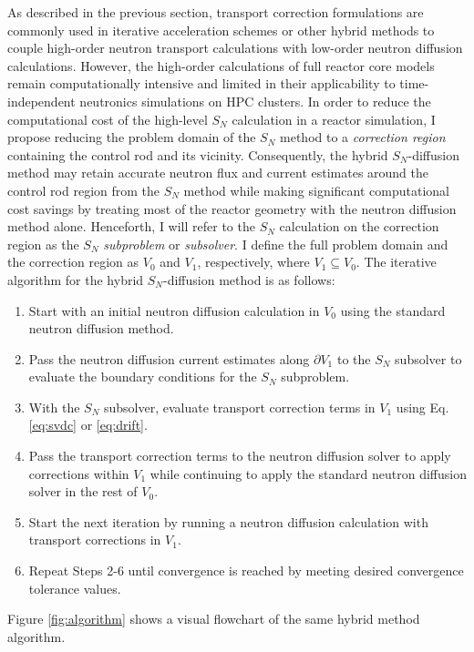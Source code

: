 As described in the previous section, transport correction formulations are commonly used in
iterative acceleration schemes or other hybrid methods to couple high-order neutron transport
calculations with low-order neutron diffusion calculations. However, the high-order calculations of
full reactor core models remain computationally intensive and limited in their applicability to
time-independent neutronics simulations on \gls{HPC} clusters.
In order to reduce the computational cost of the high-level $S_N$ calculation in a reactor
simulation, I propose reducing
the problem domain of the $S_N$ method to a \textit{correction region} containing the control rod
and its vicinity. Consequently, the hybrid $S_N$-diffusion method may retain accurate neutron flux
and current estimates around the control rod region from the $S_N$ method while making significant
computational cost savings by treating most of the reactor geometry with the neutron diffusion
method alone. Henceforth, I will refer to the $S_N$ calculation on the correction
region as the $S_N$ \textit{subproblem} or \textit{subsolver}. I define the full problem
domain and the correction region as $V_0$ and $V_1$, respectively, where
$V_1\subseteq V_0$. The iterative algorithm for the hybrid $S_N$-diffusion method is as follows:
%
\begin{enumerate}
  \item Start with an initial neutron diffusion calculation in $V_0$ using the standard neutron
    diffusion method.
  \item Pass the neutron diffusion current estimates along
    $\partial V_1$ to the $S_N$ subsolver to evaluate the boundary conditions for the $S_N$
    subproblem.
  \item With the $S_N$ subsolver, evaluate transport correction terms in $V_1$ using Eq.
    \ref{eq:svdc} or \ref{eq:drift}.
  \item Pass the transport correction terms to the neutron diffusion solver to apply corrections
    within $V_1$ while continuing to apply the standard neutron diffusion solver
    in the rest of $V_0$.
  \item Start the next iteration by running a neutron diffusion calculation with transport
    corrections in $V_1$.
  \item Repeat Steps 2-6 until convergence is reached by meeting desired convergence tolerance
    values.
\end{enumerate}
%
Figure \ref{fig:algorithm} shows a visual flowchart of the same hybrid method algorithm.

